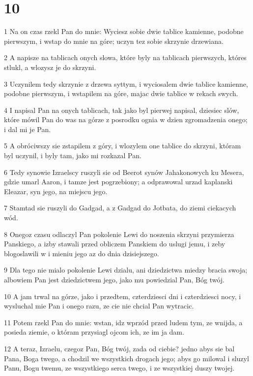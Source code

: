\chapter{10}

\par 1 Na on czas rzekl Pan do mnie: Wyciesz sobie dwie tablice kamienne, podobne pierwszym, i wstap do mnie na góre; uczyn tez sobie skrzynie drzewiana.
\par 2 A napisze na tablicach onych slowa, które byly na tablicach pierwszych, któres stlukl, a wlozysz je do skrzyni.
\par 3 Uczynilem tedy skrzynie z drzewa syttym, i wyciosalem dwie tablice kamienne, podobne pierwszym, i wstapilem na góre, majac dwie tablice w rekach swych.
\par 4 I napisal Pan na onych tablicach, tak jako byl pierwej napisal, dziesiec slów, które mówil Pan do was na górze z posrodku ognia w dzien zgromadzenia onego; i dal mi je Pan.
\par 5 A obróciwszy sie zstapilem z góry, i wlozylem one tablice do skrzyni, któram byl uczynil, i byly tam, jako mi rozkazal Pan.
\par 6 Tedy synowie Izraelscy ruszyli sie od Beerot synów Jahakonowych ku Mesera, gdzie umarl Aaron, i tamze jest pogrzebiony; a odprawowal urzad kaplanski Eleazar, syn jego, na miejscu jego.
\par 7 Stamtad sie ruszyli do Gadgad, a z Gadgad do Jotbata, do ziemi ciekacych wód.
\par 8 Onegoz czasu odlaczyl Pan pokolenie Lewi do noszenia skrzyni przymierza Panskiego, a izby stawali przed obliczem Panskiem do uslugi jemu, i zeby blogoslawili w i mieniu jego az do dnia dzisiejszego.
\par 9 Dla tego nie mialo pokolenie Lewi dzialu, ani dziedzictwa miedzy bracia swoja; albowiem Pan jest dziedzictwem jego, jako mu powiedzial Pan, Bóg twój.
\par 10 A jam trwal na górze, jako i przedtem, czterdziesci dni i czterdziesci nocy, i wysluchal mie Pan i onego razu, ze cie nie chcial Pan wytracic.
\par 11 Potem rzekl Pan do mnie: wstan, idz wprzód przed ludem tym, ze wnijda, a posieda ziemie, o któram przysiagl ojcom ich, ze im ja dam.
\par 12 A teraz, Izraelu, czegoz Pan, Bóg twój, zada od ciebie? jedno abys sie bal Pana, Boga twego, a chodzil we wszystkich drogach jego; abys go milowal i sluzyl Panu, Bogu twemu, ze wszystkiego serca twego, i ze wszystkiej duszy twojej.
